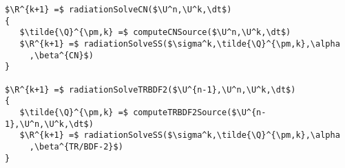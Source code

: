 \begin{lstlisting}[mathescape,columns=fullflexible,
   basicstyle=\fontfamily{lmvtt}\selectfont]
$\R^{k+1} =$ radiationSolveCN($\U^n,\U^k,\dt$)
{
   $\tilde{\Q}^{\pm,k} =$ computeCNSource($\U^n,\U^k,\dt$)
   $\R^{k+1} =$ radiationSolveSS($\sigma^k,\tilde{\Q}^{\pm,k},\alpha
     ,\beta^{CN}$)
}

$\R^{k+1} =$ radiationSolveTRBDF2($\U^{n-1},\U^n,\U^k,\dt$)
{
   $\tilde{\Q}^{\pm,k} =$ computeTRBDF2Source($\U^{n-1},\U^n,\U^k,\dt$)
   $\R^{k+1} =$ radiationSolveSS($\sigma^k,\tilde{\Q}^{\pm,k},\alpha
     ,\beta^{TR/BDF-2}$)
}
\end{lstlisting}


